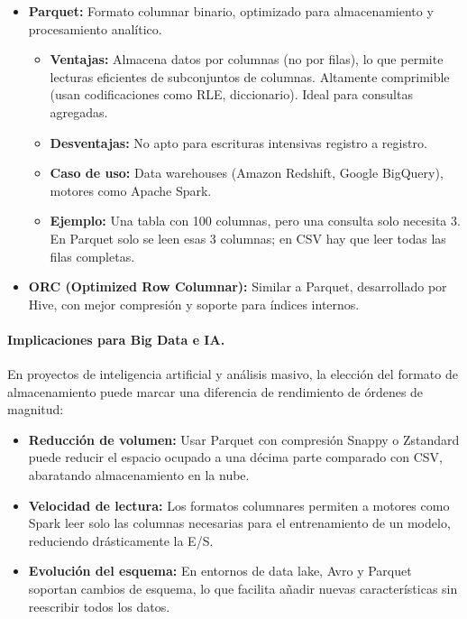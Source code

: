 \documentclass[12pt,a4paper,openany,oneside]{book}
\begin{document}
\begin{itemize}
\begin{itemize}
        \end{itemize}
    \item \textbf{Parquet:} Formato columnar binario, optimizado para almacenamiento y procesamiento analítico.
        \begin{itemize}
            \item \textbf{Ventajas:} Almacena datos por columnas (no por filas), lo que permite lecturas eficientes de subconjuntos de columnas. Altamente comprimible (usan codificaciones como RLE, diccionario). Ideal para consultas agregadas.
            \item \textbf{Desventajas:} No apto para escrituras intensivas registro a registro.
            \item \textbf{Caso de uso:} Data warehouses (Amazon Redshift, Google BigQuery), motores como Apache Spark.
            \item \textbf{Ejemplo:} Una tabla con 100 columnas, pero una consulta solo necesita 3. En Parquet solo se leen esas 3 columnas; en CSV hay que leer todas las filas completas.
        \end{itemize}
    \item \textbf{ORC (Optimized Row Columnar):} Similar a Parquet, desarrollado por Hive, con mejor compresión y soporte para índices internos.
\end{itemize}

\paragraph{Implicaciones para Big Data e IA.}
En proyectos de inteligencia artificial y análisis masivo, la elección del formato de almacenamiento puede marcar una diferencia de rendimiento de órdenes de magnitud:
\begin{itemize}
    \item \textbf{Reducción de volumen:} Usar Parquet con compresión Snappy o Zstandard puede reducir el espacio ocupado a una décima parte comparado con CSV, abaratando almacenamiento en la nube.
    \item \textbf{Velocidad de lectura:} Los formatos columnares permiten a motores como Spark leer solo las columnas necesarias para el entrenamiento de un modelo, reduciendo drásticamente la E/S.
    \item \textbf{Evolución del esquema:} En entornos de data lake, Avro y Parquet soportan cambios de esquema, lo que facilita añadir nuevas características sin reescribir todos los datos.
\end{itemize}
\end{document}
